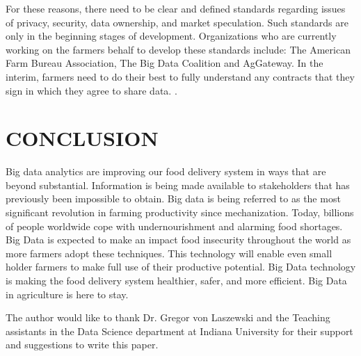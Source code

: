 \documentclass[sigconf]{acmart}
\begin{document}
For these reasons, there need to be clear and defined standards regarding issues of privacy, security, data ownership, and market speculation. Such standards are only in the beginning stages of development. Organizations who are currently working on the farmers behalf to develop these standards include: The American Farm Bureau Association, The Big Data Coalition and AgGateway. In the interim, farmers need to do their best to fully understand any contracts that they sign in which they agree to share data.   \cite{Wolfert}.

\section{CONCLUSION}
Big data analytics are improving our food delivery system in ways that are beyond substantial.  Information is being made available to stakeholders that has previously been impossible to obtain. Big data is being referred to as the most significant revolution in farming productivity since mechanization. Today, billions of people worldwide cope with undernourishment and alarming food shortages. Big Data is expected to make an impact food insecurity throughout the world as more farmers adopt these techniques. This technology will enable even small holder farmers to make full use of their productive potential.  Big Data technology is making the food delivery system healthier, safer, and more efficient.  Big Data in agriculture is here to stay.
\begin{acks}

  The author would like to thank Dr. Gregor von Laszewski and the Teaching assistants in the Data Science department at Indiana  University for their support and suggestions to write this paper.

\end{acks}




 
\end{document}
